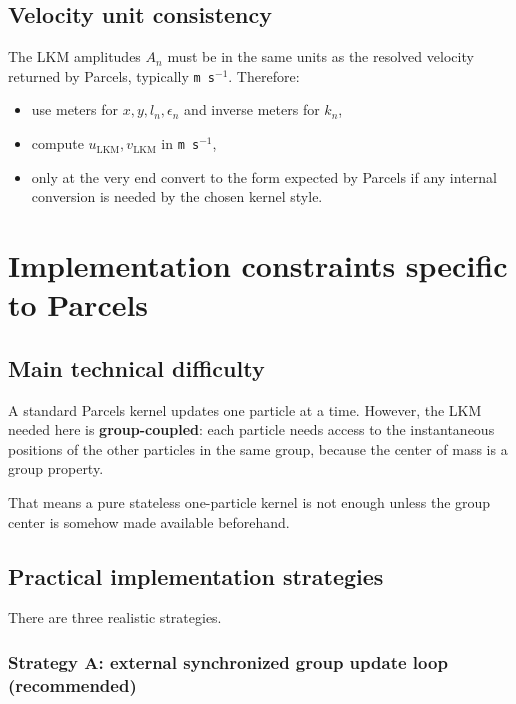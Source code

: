 \documentclass[11pt,a4paper]{article}
\begin{document}
	
	
	
	\subsection{Velocity unit consistency}
	
	The LKM amplitudes $A_n$ must be in the same units as the resolved velocity returned by Parcels, typically \texttt{m s$^{-1}$}. Therefore:
	\begin{itemize}[leftmargin=1.5em]
		\item use meters for $x,y,l_n,\epsilon_n$ and inverse meters for $k_n$,
		\item compute $u_{\mathrm{LKM}},v_{\mathrm{LKM}}$ in \texttt{m s$^{-1}$},
		\item only at the very end convert to the form expected by Parcels if any internal conversion is needed by the chosen kernel style.
	\end{itemize}
	
	\section{Implementation constraints specific to Parcels}
	
	\subsection{Main technical difficulty}
	
	A standard Parcels kernel updates one particle at a time. However, the LKM needed here is \textbf{group-coupled}: each particle needs access to the instantaneous positions of the other particles in the same group, because the center of mass is a group property.
	
	That means a pure stateless one-particle kernel is not enough unless the group center is somehow made available beforehand.
	
	\subsection{Practical implementation strategies}
	
	There are three realistic strategies.
	
	\subsubsection*{Strategy A: external synchronized group update loop (recommended)}
	
\end{document}

